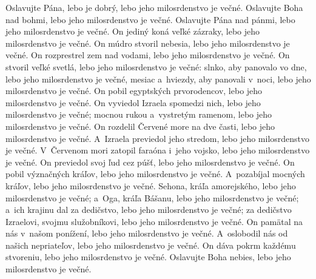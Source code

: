 Oslavujte Pána, lebo je dobrý,
lebo jeho milosrdenstvo je večné.
\versseparator
Oslavujte Boha nad bohmi,
lebo jeho milosrdenstvo je večné.
\versseparator
Oslavujte Pána nad pánmi,
lebo jeho milosrdenstvo je večné.
\versseparator
On jediný koná veľké zázraky,
lebo jeho milosrdenstvo je večné.
\versseparator
On múdro stvoril nebesia,
lebo jeho milosrdenstvo je večné.
\versseparator
On rozprestrel zem nad vodami,
lebo jeho milosrdenstvo je večné.
\versseparator
On stvoril veľké svetlá,
lebo jeho milosrdenstvo je večné:
\versseparator
slnko, aby panovalo vo dne,
lebo jeho milosrdenstvo je večné,
\versseparator
mesiac a~hviezdy, aby panovali v~noci,
lebo jeho milosrdenstvo je večné.
\versseparator
On pobil egyptských prvorodencov,
lebo jeho milosrdenstvo je večné.
\versseparator
On vyviedol Izraela spomedzi nich,
lebo jeho milosrdenstvo je večné;
\versseparator
mocnou rukou a~vystretým ramenom,
lebo jeho milosrdenstvo je večné.
\versseparator
On rozdelil Červené more na dve časti,
lebo jeho milosrdenstvo je večné.
\versseparator
A~Izraela previedol jeho stredom,
lebo jeho milosrdenstvo je večné.
\versseparator
V~Červenom mori zatopil faraóna i~jeho vojsko,
lebo jeho milosrdenstvo je večné.
\versseparator
On previedol svoj ľud cez púšť,
lebo jeho milosrdenstvo je večné.
\versseparator
On pobil význačných kráľov,
lebo jeho milosrdenstvo je večné.
\versseparator
A~pozabíjal mocných kráľov,
lebo jeho milosrdenstvo je večné.
\versseparator
Sehona, kráľa amorejského,
lebo jeho milosrdenstvo je večné;
\versseparator
a~Oga, kráľa Bášanu,
lebo jeho milosrdenstvo je večné;
\versseparator
a~ich krajinu dal za dedičstvo,
lebo jeho milosrdenstvo je večné;
\versseparator
za dedičstvo Izraelovi, svojmu služobníkovi,
lebo jeho milosrdenstvo je večné.
\versseparator
On pamätal na nás v~našom ponížení,
lebo jeho milosrdenstvo je večné.
\versseparator
A~oslobodil nás od našich nepriateľov,
lebo jeho milosrdenstvo je večné.
\versseparator
On dáva pokrm každému stvoreniu,
lebo jeho milosrdenstvo je večné.
\versseparator
Oslavujte Boha nebies,
lebo jeho milosrdenstvo je večné.